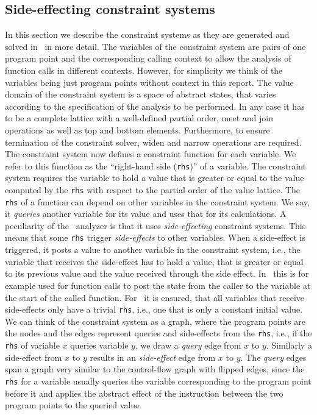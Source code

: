   \subsection{Side-effecting constraint systems}
  \label{sec:background:constrSys}
  In this section we describe the constraint systems as they are generated and solved in \gob\ in more detail. The variables of the constraint system are pairs of one program point and the corresponding calling context to allow the analysis of function calls in different contexts. However, for simplicity we think of the variables being just program points without context in this report.
  The value domain of the constraint system is a space of abstract states, that varies according to the specification of the analysis to be performed. In any case it has to be a complete lattice with a well-defined partial order, meet and join operations as well as top and bottom elements. Furthermore, to ensure termination of the constraint solver, widen and narrow operations are required.
  The constraint system now defines a constraint function for each variable. We refer to this function as the ``right-hand side (\texttt{rhs})'' of a variable. The constraint system requires the variable to hold a value that is greater or equal to the value computed by the \texttt{rhs} with respect to the partial order of the value lattice.
  The \texttt{rhs} of a function can depend on other variables in the constraint system. We say, it \textit{queries} another variable for its value and uses that for its calculations.
  A peculiarity of the \gob\ analyzer is that it uses \textit{side-effecting} constraint systems. This means that some \texttt{rhs} trigger \textit{side-effects} to other variables. When a side-effect is triggered, it posts a value to another variable in the constraint system, i.e., the variable that receives the side-effect has to hold a value, that is greater or equal to its previous value and the value received through the side effect. In \gob\ this is for example used for function calls to post the state from the caller to the variable at the start of the called function.
  For \gob\ it is ensured, that all variables that receive side-effects only have a trivial \texttt{rhs}, i.e., one that is only a constant initial value.
  We can think of the constraint system as a graph, where the program points are the nodes and the edges represent queries and side-effects from the \texttt{rhs}, i.e., if the \texttt{rhs} of variable $x$ queries variable $y$, we draw a \textit{query} edge from $x$ to $y$. Similarly a side-effect from $x$ to $y$ results in an \textit{side-effect} edge from $x$ to $y$. The \textit{query} edges span a graph very similar to the control-flow graph with flipped edges, since the \texttt{rhs} for a variable usually queries the variable corresponding to the program point before it and applies the abstract effect of the instruction between the two program points to the queried value.

